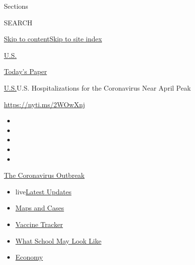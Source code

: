 Sections

SEARCH

\protect\hyperlink{site-content}{Skip to
content}\protect\hyperlink{site-index}{Skip to site index}

\href{https://www.nytimes.com/section/us}{U.S.}

\href{https://myaccount.nytimes.com/auth/login?response_type=cookie\&client_id=vi}{}

\href{https://www.nytimes.com/section/todayspaper}{Today's Paper}

\href{/section/us}{U.S.}\textbar{}U.S. Hospitalizations for the
Coronavirus Near April Peak

\url{https://nyti.ms/2WOwXnj}

\begin{itemize}
\item
\item
\item
\item
\item
\end{itemize}

\href{https://www.nytimes.com/news-event/coronavirus?action=click\&pgtype=Article\&state=default\&region=TOP_BANNER\&context=storylines_menu}{The
Coronavirus Outbreak}

\begin{itemize}
\tightlist
\item
  live\href{https://www.nytimes.com/2020/08/01/world/coronavirus-covid-19.html?action=click\&pgtype=Article\&state=default\&region=TOP_BANNER\&context=storylines_menu}{Latest
  Updates}
\item
  \href{https://www.nytimes.com/interactive/2020/us/coronavirus-us-cases.html?action=click\&pgtype=Article\&state=default\&region=TOP_BANNER\&context=storylines_menu}{Maps
  and Cases}
\item
  \href{https://www.nytimes.com/interactive/2020/science/coronavirus-vaccine-tracker.html?action=click\&pgtype=Article\&state=default\&region=TOP_BANNER\&context=storylines_menu}{Vaccine
  Tracker}
\item
  \href{https://www.nytimes.com/interactive/2020/07/29/us/schools-reopening-coronavirus.html?action=click\&pgtype=Article\&state=default\&region=TOP_BANNER\&context=storylines_menu}{What
  School May Look Like}
\item
  \href{https://www.nytimes.com/live/2020/07/31/business/stock-market-today-coronavirus?action=click\&pgtype=Article\&state=default\&region=TOP_BANNER\&context=storylines_menu}{Economy}
\end{itemize}

